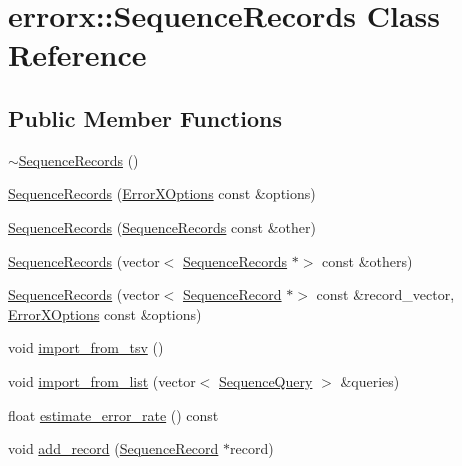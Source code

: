 \hypertarget{classerrorx_1_1_sequence_records}{}\section{errorx\+:\+:Sequence\+Records Class Reference}
\label{classerrorx_1_1_sequence_records}
\subsection*{Public Member Functions}
\begin{DoxyCompactItemize}
\item 
\mbox{\hyperlink{classerrorx_1_1_sequence_records_a0fac9e704c40af45faef33a51b1e160d}{$\sim$\+Sequence\+Records}} ()
\item 
\mbox{\hyperlink{classerrorx_1_1_sequence_records_af45d18ad4ff7f3348289f640e3d6ebca}{Sequence\+Records}} (\mbox{\hyperlink{classerrorx_1_1_error_x_options}{Error\+X\+Options}} const \&options)
\item 
\mbox{\hyperlink{classerrorx_1_1_sequence_records_ae5f0b141e16902f008d5dc65cef492ef}{Sequence\+Records}} (\mbox{\hyperlink{classerrorx_1_1_sequence_records}{Sequence\+Records}} const \&other)
\item 
\mbox{\hyperlink{classerrorx_1_1_sequence_records_a0c868ff30175b97b01beb6239d432603}{Sequence\+Records}} (vector$<$ \mbox{\hyperlink{classerrorx_1_1_sequence_records}{Sequence\+Records}} $\ast$$>$ const \&others)
\item 
\mbox{\hyperlink{classerrorx_1_1_sequence_records_aa5056e29e388a8cc013d304448029a82}{Sequence\+Records}} (vector$<$ \mbox{\hyperlink{classerrorx_1_1_sequence_record}{Sequence\+Record}} $\ast$$>$ const \&record\+\_\+vector, \mbox{\hyperlink{classerrorx_1_1_error_x_options}{Error\+X\+Options}} const \&options)
\item 
void \mbox{\hyperlink{classerrorx_1_1_sequence_records_acc6c04160f2584ae83ed7636104aadaf}{import\+\_\+from\+\_\+tsv}} ()
\item 
void \mbox{\hyperlink{classerrorx_1_1_sequence_records_a3fd1286256f256644c06413bb705df88}{import\+\_\+from\+\_\+list}} (vector$<$ \mbox{\hyperlink{classerrorx_1_1_sequence_query}{Sequence\+Query}} $>$ \&queries)
\item 
float \mbox{\hyperlink{classerrorx_1_1_sequence_records_a84905f56b5cebe34c7300be425964a5b}{estimate\+\_\+error\+\_\+rate}} () const
\item 
void \mbox{\hyperlink{classerrorx_1_1_sequence_records_aae76e748971bbf783b3463be77aa1a3f}{add\+\_\+record}} (\mbox{\hyperlink{classerrorx_1_1_sequence_record}{Sequence\+Record}} $\ast$record)

\end{DoxyCompactItemize}
